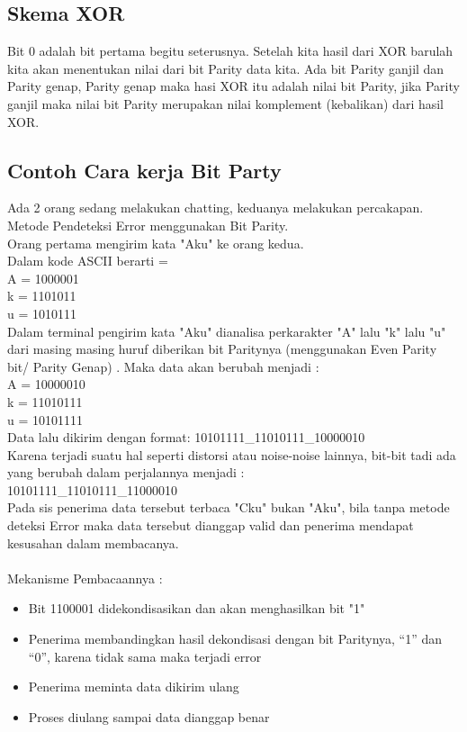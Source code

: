 
\subsection{Skema XOR}
Bit 0 adalah bit pertama begitu seterusnya. Setelah kita hasil dari XOR barulah kita akan menentukan nilai dari bit Parity data kita. Ada bit Parity ganjil dan Parity genap, Parity genap maka hasi XOR itu adalah nilai bit Parity, jika Parity ganjil maka nilai bit Parity merupakan nilai komplement (kebalikan) dari hasil XOR.

\subsection{Contoh Cara kerja Bit Party}
Ada 2 orang sedang melakukan chatting, keduanya melakukan percakapan. Metode Pendeteksi Error menggunakan Bit Parity.\\
Orang pertama mengirim kata "Aku" ke orang kedua.\\
Dalam kode ASCII berarti =\\
A = 1000001\\
k = 1101011\\
u = 1010111\\
Dalam terminal pengirim kata "Aku" dianalisa perkarakter "A" lalu "k" lalu "u"  dari masing masing huruf diberikan bit Paritynya (menggunakan Even Parity bit/ Parity Genap) . Maka data akan berubah menjadi :\\
A = 10000010\\
k = 11010111\\
u = 10101111\\
Data lalu dikirim dengan format: 10101111\_11010111\_10000010\\
Karena terjadi suatu hal seperti distorsi atau noise-noise lainnya, bit-bit tadi ada yang berubah dalam perjalannya menjadi :\\
10101111\_11010111\_11000010\\
Pada sis penerima data tersebut terbaca "Cku" bukan "Aku", bila tanpa metode deteksi Error maka data tersebut dianggap valid dan penerima mendapat kesusahan dalam membacanya.\\ \\
Mekanisme Pembacaannya :
\begin{itemize}
\item Bit 1100001 didekondisasikan dan akan menghasilkan bit "1"
\item Penerima membandingkan hasil dekondisasi dengan bit Paritynya, “1” dan “0”, karena tidak sama maka terjadi error
\item Penerima meminta data dikirim ulang
\item Proses diulang sampai data dianggap benar
\end{itemize}

